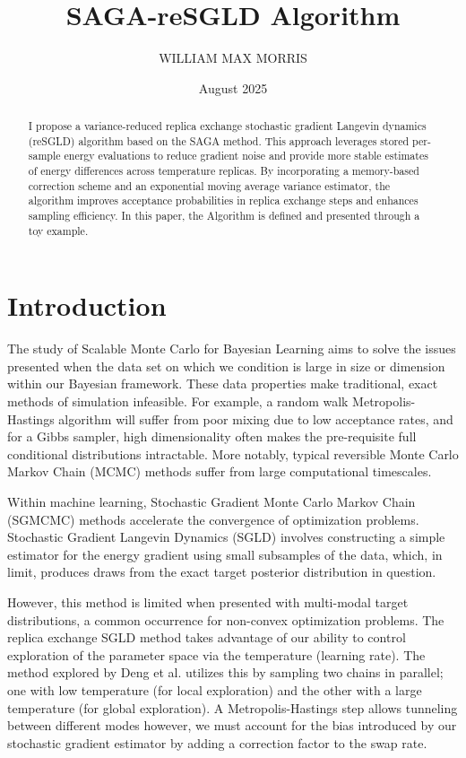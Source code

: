 \documentclass{article}
\title{SAGA-reSGLD Algorithm}
\author{WILLIAM MAX MORRIS}
\date{August 2025}
\begin{document}
\maketitle

\begin{abstract}
I propose a variance-reduced replica exchange stochastic gradient Langevin dynamics (reSGLD) algorithm based on the SAGA method. 
This approach leverages stored per-sample energy evaluations to reduce gradient noise and provide more stable estimates of energy differences across temperature replicas. 
By incorporating a memory-based correction scheme and an exponential moving average variance estimator, the algorithm improves acceptance probabilities in replica exchange steps and enhances sampling efficiency. 
In this paper, the Algorithm is defined and presented through a toy example.

\end{abstract}
\newpage

\section{Introduction}
The study of Scalable Monte Carlo for Bayesian Learning \cite{Fearnhead2024} 
aims to solve the issues presented when the data set on which we condition is large in size or dimension within our Bayesian framework. These data properties make traditional, exact methods of simulation infeasible. For example, a random walk Metropolis-Hastings algorithm will suffer from poor mixing due to low acceptance rates, and for a Gibbs sampler, high dimensionality often makes the pre-requisite full conditional distributions intractable. More notably, typical reversible Monte Carlo Markov Chain (MCMC) methods suffer from large computational timescales.

Within machine learning, Stochastic Gradient Monte Carlo Markov Chain (SGMCMC) methods accelerate the convergence of optimization problems. Stochastic Gradient Langevin Dynamics (SGLD) \cite{Fearnhead2024} involves constructing a simple estimator for the energy gradient using small subsamples of the data, which, in limit, produces draws from the exact target posterior distribution in question. 

However, this method is limited when presented with multi-modal target distributions, a common occurrence for non-convex optimization problems. The replica exchange SGLD \cite{Deng2021} method takes advantage of our ability to control exploration of the parameter space via the temperature (learning rate). The method explored by Deng et al. utilizes this by sampling two chains in parallel; one with low temperature (for local exploration) and the other with a large temperature (for global exploration). A Metropolis-Hastings step allows tunneling between different modes \cite{Deng2021} however, we must account for the bias introduced by our stochastic gradient estimator by adding a correction factor to the swap rate.
\end{document}
